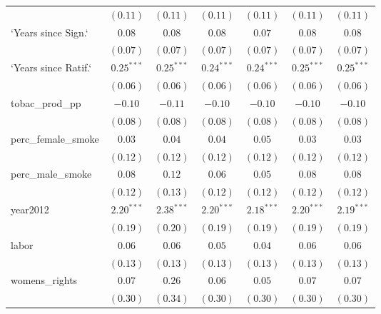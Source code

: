 \begin{table}[!h]
\begin{center}
\begin{tabular}{l c c c c c c }
                        & $(0.11)$     & $(0.11)$     & $(0.11)$     & $(0.11)$     & $(0.11)$     & $(0.11)$     \\
`Years since Sign.`     & $0.08$       & $0.08$       & $0.08$       & $0.07$       & $0.08$       & $0.08$       \\
                        & $(0.07)$     & $(0.07)$     & $(0.07)$     & $(0.07)$     & $(0.07)$     & $(0.07)$     \\
`Years since Ratif.`    & $0.25^{***}$ & $0.25^{***}$ & $0.24^{***}$ & $0.24^{***}$ & $0.25^{***}$ & $0.25^{***}$ \\
                        & $(0.06)$     & $(0.06)$     & $(0.06)$     & $(0.06)$     & $(0.06)$     & $(0.06)$     \\
tobac\_prod\_pp         & $-0.10$      & $-0.11$      & $-0.10$      & $-0.10$      & $-0.10$      & $-0.10$      \\
                        & $(0.08)$     & $(0.08)$     & $(0.08)$     & $(0.08)$     & $(0.08)$     & $(0.08)$     \\
perc\_female\_smoke     & $0.03$       & $0.04$       & $0.04$       & $0.05$       & $0.03$       & $0.03$       \\
                        & $(0.12)$     & $(0.12)$     & $(0.12)$     & $(0.12)$     & $(0.12)$     & $(0.12)$     \\
perc\_male\_smoke       & $0.08$       & $0.12$       & $0.06$       & $0.05$       & $0.08$       & $0.08$       \\
                        & $(0.12)$     & $(0.13)$     & $(0.12)$     & $(0.12)$     & $(0.12)$     & $(0.12)$     \\
year2012                & $2.20^{***}$ & $2.38^{***}$ & $2.20^{***}$ & $2.18^{***}$ & $2.20^{***}$ & $2.19^{***}$ \\
                        & $(0.19)$     & $(0.20)$     & $(0.19)$     & $(0.19)$     & $(0.19)$     & $(0.19)$     \\
labor                   & $0.06$       & $0.06$       & $0.05$       & $0.04$       & $0.06$       & $0.06$       \\
                        & $(0.13)$     & $(0.13)$     & $(0.13)$     & $(0.13)$     & $(0.13)$     & $(0.13)$     \\
womens\_rights          & $0.07$       & $0.26$       & $0.06$       & $0.05$       & $0.07$       & $0.07$       \\
                        & $(0.30)$     & $(0.34)$     & $(0.30)$     & $(0.30)$     & $(0.30)$     & $(0.30)$     \\

\end{tabular}
\end{center}
\end{table}
